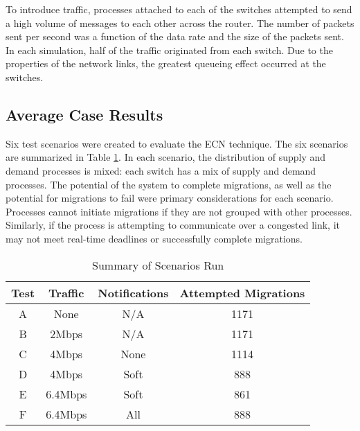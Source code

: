 To introduce traffic, processes attached to each of the switches attempted to send a high volume of messages to each other across the router.
The number of packets sent per second was a function of the data rate and the size of the packets sent.
In each simulation, half of the traffic originated from each switch.
Due to the properties of the network links, the greatest queueing effect occurred at the switches.

\subsection{Average Case Results}
\label{sect:results}
Six test scenarios were created to evaluate the \ac{ECN} technique.
The six scenarios are summarized in Table \ref{tab:scenarios}.
In each scenario, the distribution of supply and demand processes is mixed: each switch has a mix of supply and demand processes.
The potential of the system to complete migrations, as well as the potential for migrations to fail were primary considerations for each scenario.
Processes cannot initiate migrations if they are not grouped with other processes.
Similarly, if the process is attempting to communicate over a congested link, it may not meet real-time deadlines or successfully complete migrations.

\begin{table}
\centering
\caption{Summary of Scenarios Run}
\begin{tabular}{| c | c | c | c |}
    \hline
    Test & Traffic & Notifications & Attempted Migrations \\ \hline
    A & None & N/A & 1171 \\ \hline
    B & 2Mbps & N/A & 1171 \\ \hline
    C & 4Mbps & None & 1114  \\ \hline
    D & 4Mbps & Soft & 888 \\ \hline
    E & 6.4Mbps & Soft & 861 \\ \hline
    F & 6.4Mbps & All & 888 \\ \hline
\end{tabular}
\label{tab:scenarios}
\end{table}

